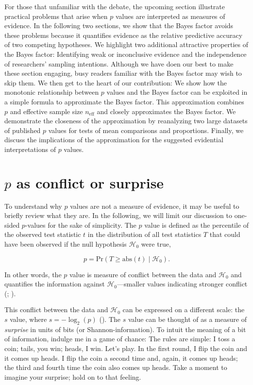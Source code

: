 \documentclass[
  man,
  floatsintext,
  longtable,
  nolmodern,
  notxfonts,
  notimes,
  colorlinks=true,linkcolor=blue,citecolor=blue,urlcolor=blue]{apa7}
\begin{document}
For those that unfamiliar with the debate, the upcoming section
illustrate practical problems that arise when \(p\) values are
interpreted as measures of evidence. In the following two sections, we
show that the Bayes factor avoids these problems because it quantifies
evidence as the relative predictive accuracy of two competing
hypotheses. We highlight two additional attractive properties of the
Bayes factor: Identifying weak or inconclusive evidence and the
independence of researchers' sampling intentions. Although we have doen
our best to make these section engaging, busy readers familiar with the
Bayes factor may wish to skip them. We then get to the heart of our
contribution: We show how the monotonic relationship between \(p\)
values and the Bayes factor can be exploited in a simple formula to
approximate the Bayes factor. This approximation combines \(p\) and
effective sample size \(n_\text{eff}\) and closely approximates the
Bayes factor. We demonstrate the closeness of the approximation by
reanalyzing two large datasets of published \(p\) values for tests of
mean comparisons and proportions. Finally, we discuss the implications
of the approximation for the suggested evidential interpretations of
\(p\) values.

\section{\texorpdfstring{\(p\) as conflict or
surprise}{p as conflict or surprise}}\label{p-as-conflict-or-surprise}

To understand why \(p\) values are not a measure of evidence, it may be
useful to briefly review what they are. In the following, we will limit
our discussion to one-sided \(p\)-values for the sake of simplicity. The
\(p\) value is defined as the percentile of the observed test statistic
\(t\) in the distribution of all test statistics \(T\) that could have
been observed if the null hypothesis \(\mathcal{H}_0\) were true,

\[
p = \text{Pr}(T \geq \text{abs}(t) \mid \mathcal{H}_0).
\]

In other words, the \(p\) value is measure of conflict between the data
and \(\mathcal{H}_0\) and quantifies the information against
\(\mathcal{H}_0\)---smaller values indicating stronger conflict
(;
).

This conflict between the data and \(\mathcal{H}_0\) can be expressed on
a different scale: the \(s\) value, where \(s = -\log_2(p)\)
(). The \(s\) value can
be thought of as a measure of \emph{surprise} in units of bits (or
Shannon-information). To intuit the meaning of a bit of information,
indulge me in a game of chance: The rules are simple: I toss a coin;
tails, you win; heads, I win. Let's play. In the first round, I flip the
coin and it comes up heads. I flip the coin a second time and, again, it
comes up heads; the third and fourth time the coin also comes up heads.
Take a moment to imagine your surprise; hold on to that feeling.
\end{document}
